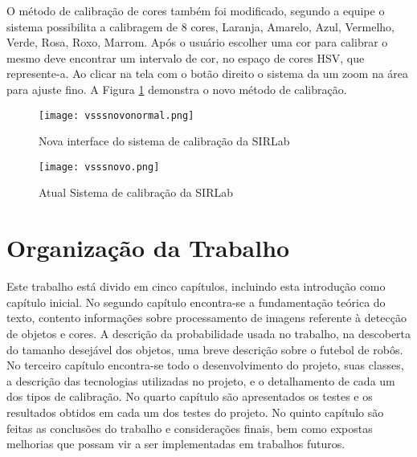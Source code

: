 O método de calibração de cores também foi modificado, segundo a equipe\cite{VSSVision} o sistema possibilita a calibragem de 8 cores, Laranja, Amarelo, Azul, Vermelho, Verde, Rosa, Roxo, Marrom. Após o usuário escolher uma cor para calibrar o mesmo deve encontrar um intervalo de cor, no espaço de cores HSV, que represente-a. Ao clicar na tela com o botão direito o sistema da um zoom na área para ajuste fino. A Figura \ref{SIRLabNovaCalibracao} demonstra o novo método de calibração.
\begin{figure}[H]
\begin{minipage}[H]{0.45\linewidth}
\hspace{0.5cm}
\centering
\texttt{[image: vsssnovonormal.png]}
\caption{Nova interface do sistema de calibração da SIRLab\cite{VSSVision}}
\label{SIRLabNova}
\end{minipage}
\hspace{0.5cm}
\begin{minipage}[H]{0.40\linewidth}
\centering
\texttt{[image: vsssnovo.png]}
\caption{Atual Sistema de calibração da SIRLab\cite{VSSVision}}
\label{SIRLabNovaCalibracao}
\end{minipage}
\end{figure}	


\section{Organização da Trabalho} \label{Sec:Organizacao}

Este trabalho está divido em cinco capítulos, incluindo esta introdução como capítulo inicial. No segundo capítulo encontra-se a fundamentação teórica do texto, contento informaç\~oes sobre processamento de imagens referente à detecção de objetos e cores. A descrição da probabilidade usada no trabalho, na descoberta do tamanho desejável dos objetos, uma breve descrição sobre o futebol de robôs. No terceiro capítulo encontra-se todo o desenvolvimento do projeto, suas classes, a descrição das tecnologias utilizadas no projeto, e o detalhamento de cada um dos tipos de calibração. No quarto capítulo são apresentados os testes e os resultados obtidos em cada um dos testes do projeto. No quinto capítulo são feitas as conclusões do trabalho e considerações finais, bem como expostas melhorias que possam vir a ser implementadas em trabalhos futuros.
